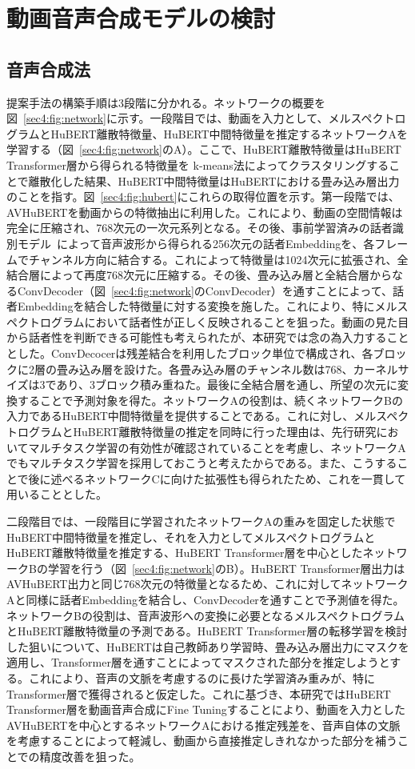 \documentclass[12pt]{jarticle}
\numberwithin{equation}{section}    %
\numberwithin{figure}{section}      %
\numberwithin{table}{section}      %
\begin{document}
\section{動画音声合成モデルの検討}
\subsection{音声合成法}
提案手法の構築手順は3段階に分かれる。ネットワークの概要を図~\ref{sec4:fig:network}に示す。一段階目では、動画を入力として、メルスペクトログラムとHuBERT離散特徴量、HuBERT中間特徴量を推定するネットワークAを学習する（図~\ref{sec4:fig:network}のA）。ここで、HuBERT離散特徴量はHuBERT Transformer層から得られる特徴量を k-means法によってクラスタリングすることで離散化した結果、HuBERT中間特徴量はHuBERTにおける畳み込み層出力のことを指す。図~\ref{sec4:fig:hubert}にこれらの取得位置を示す。第一段階では、AVHuBERTを動画からの特徴抽出に利用した。これにより、動画の空間情報は完全に圧縮され、768次元の一次元系列となる。その後、事前学習済みの話者識別モデル~\cite{wan2018generalized}によって音声波形から得られる256次元の話者Embeddingを、各フレームでチャンネル方向に結合する。これによって特徴量は1024次元に拡張され、全結合層によって再度768次元に圧縮する。その後、畳み込み層と全結合層からなるConvDecoder（図~\ref{sec4:fig:network}のConvDecoder）を通すことによって、話者Embeddingを結合した特徴量に対する変換を施した。これにより、特にメルスペクトログラムにおいて話者性が正しく反映されることを狙った。動画の見た目から話者性を判断できる可能性も考えられたが、本研究では念の為入力することとした。ConvDecocerは残差結合を利用したブロック単位で構成され、各ブロックに2層の畳み込み層を設けた。各畳み込み層のチャンネル数は768、カーネルサイズは3であり、3ブロック積み重ねた。最後に全結合層を通し、所望の次元に変換することで予測対象を得た。ネットワークAの役割は、続くネットワークBの入力であるHuBERT中間特徴量を提供することである。これに対し、メルスペクトログラムとHuBERT離散特徴量の推定を同時に行った理由は、先行研究においてマルチタスク学習の有効性が確認されていることを考慮し、ネットワークAでもマルチタスク学習を採用しておこうと考えたからである。また、こうすることで後に述べるネットワークCに向けた拡張性も得られたため、これを一貫して用いることとした。

二段階目では、一段階目に学習されたネットワークAの重みを固定した状態でHuBERT中間特徴量を推定し、それを入力としてメルスペクトログラムとHuBERT離散特徴量を推定する、HuBERT Transformer層を中心としたネットワークBの学習を行う（図~\ref{sec4:fig:network}のB）。HuBERT Transformer層出力はAVHuBERT出力と同じ768次元の特徴量となるため、これに対してネットワークAと同様に話者Embeddingを結合し、ConvDecoderを通すことで予測値を得た。ネットワークBの役割は、音声波形への変換に必要となるメルスペクトログラムとHuBERT離散特徴量の予測である。HuBERT Transformer層の転移学習を検討した狙いについて、HuBERTは自己教師あり学習時、畳み込み層出力にマスクを適用し、Transformer層を通すことによってマスクされた部分を推定しようとする。これにより、音声の文脈を考慮するのに長けた学習済み重みが、特にTransformer層で獲得されると仮定した。これに基づき、本研究ではHuBERT Transformer層を動画音声合成にFine Tuningすることにより、動画を入力としたAVHuBERTを中心とするネットワークAにおける推定残差を、音声自体の文脈を考慮することによって軽減し、動画から直接推定しきれなかった部分を補うことでの精度改善を狙った。
\end{document}
